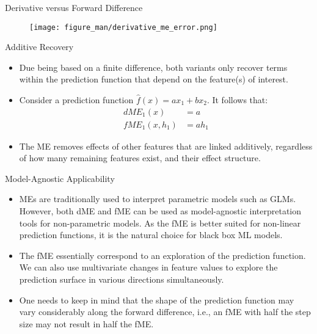 \documentclass[11pt,compress,t,notes=noshow, aspectratio=169, xcolor=table]{beamer}
\begin{document}
\begin{vbframe}{Derivative versus Forward Difference}
\begin{figure}
  \texttt{[image: figure\_man/derivative\_me\_error.png]}
\end{figure}
\end{vbframe}

\begin{vbframe}{Additive Recovery}

\begin{itemize}
\itemsep2em
\item Due being based on a finite difference, both variants only recover terms within the prediction function that depend on the feature(s) of interest.
\item Consider a prediction function $\widehat{f}(x) = ax_1 + bx_2$. It follows that:
\begin{align*}
dME_1(x) &= a \\
fME_1(x, h_1) &= ah_1
\end{align*}
\item The ME removes effects of other features that are linked additively, regardless of how many remaining features exist, and their effect structure.
\end{itemize}

\end{vbframe}


\begin{vbframe}{Model-Agnostic Applicability}

\begin{itemize}
\itemsep2em
\item MEs are traditionally used to interpret parametric models such as GLMs. However, both dME and fME can be used as model-agnostic interpretation tools for non-parametric models. As the fME is better suited for non-linear prediction functions, it is the natural choice for black box ML models.
\item The fME essentially correspond to an exploration of the prediction function. We can also use multivariate changes in feature values to explore the prediction surface in various directions simultaneously.
\item One needs to keep in mind that the shape of the prediction function may vary considerably along the forward difference, i.e., an fME with half the step size may not result in half the fME.
\end{itemize}

\end{vbframe}
\end{document}
